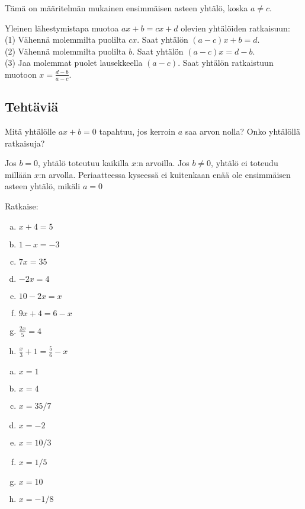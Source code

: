 Tämä on määritelmän mukainen ensimmäisen asteen yhtälö, koska $a \neq c$.

\begin{esimerkki}
Yleinen lähestymistapa muotoa $ax+b = cx+d$ olevien yhtälöiden ratkaisuun: \\
(1) Vähennä molemmilta puolilta $cx$. Saat yhtälön $(a-c)x + b = d$. \\
(2) Vähennä molemmilta puolilta $b$. Saat yhtälön $(a-c)x = d-b$. \\
(3) Jaa molemmat puolet lausekkeella $(a-c)$. Saat yhtälön ratkaistuun muotoon $x = \frac{d-b}{a-c}$.
\end{esimerkki}

\subsection*{Tehtäviä}

\begin{tehtava}
Mitä yhtälölle $ax+b = 0$ tapahtuu, jos kerroin $a$ saa arvon nolla?
Onko yhtälöllä ratkaisuja?
\begin{vastaus}
Jos $b = 0$, yhtälö toteutuu kaikilla $x$:n arvoilla. Jos $b \neq 0$, yhtälö
ei toteudu millään $x$:n arvolla. Periaatteessa kyseessä ei kuitenkaan
enää ole ensimmäisen asteen yhtälö, mikäli $a = 0$
\end{vastaus}
\end{tehtava}

\begin{tehtava}
%
Ratkaise:
\begin{enumerate}[a)]
\item $x + 4 = 5$
\item $1 - x = -3$
\item $7x = 35$
\item $-2x = 4$
\item $10 - 2x = x$
\item $9x + 4 = 6 - x$
\item $\frac{2x}{5} = 4$
\item $\frac{x}{3} + 1 = \frac{5}{6} - x$
\end{enumerate}
\begin{vastaus}
\begin{enumerate}[a)]
\item $x=1$
\item $x=4$
\item $x=35/7$
\item $x=-2$
\item $x=10/3$
\item $x=1/5$
\item $x=10$
\item $x=-1/8$
\end{enumerate}
\end{vastaus}
\end{tehtava}


